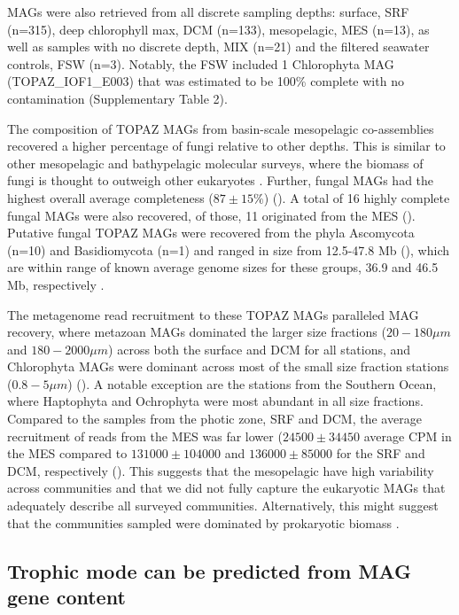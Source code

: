\documentclass[12pt]{article}
\numberwithin{equation}{section}
\begin{document}
MAGs were also retrieved from all discrete sampling depths: surface, SRF (n=315), deep chlorophyll max, DCM (n=133), mesopelagic, MES (n=13), as well as samples with no discrete depth, MIX (n=21) and the filtered seawater controls, FSW (n=3). Notably, the FSW included 1 Chlorophyta MAG (TOPAZ\_IOF1\_E003) that was estimated to be 100\% complete with no contamination (Supplementary Table 2). 

The composition of TOPAZ MAGs from basin-scale mesopelagic co-assemblies recovered a higher percentage of fungi relative to other depths. This is similar to other mesopelagic and bathypelagic molecular surveys, where the biomass of fungi is thought to outweigh other eukaryotes \citep{Morales_2019,Pernice_2015,Edgcomb_2010}. Further, fungal MAGs had the highest overall average completeness ($87 \pm 15\%$) (). A total of 16 highly complete fungal MAGs were also recovered, of those, 11 originated from the MES (). Putative fungal TOPAZ MAGs were recovered from the phyla Ascomycota (n=10) and Basidiomycota (n=1) and ranged in size from 12.5-47.8 Mb (), which are within range of known average genome sizes for these groups, 36.9 and 46.5 Mb, respectively \citep{Mohanta_2015}. 

The metagenome read recruitment to these TOPAZ MAGs paralleled MAG recovery, where metazoan MAGs dominated the larger size fractions ($20-180 \mu m$ and $180-2000 \mu m$) across both the surface and DCM for all stations, and Chlorophyta MAGs were dominant across most of the small size fraction stations ($0.8-5 \mu m$) (). A notable exception are the stations from the Southern Ocean, where Haptophyta and Ochrophyta were most abundant in all size fractions. Compared to the samples from the photic zone, SRF and DCM, the average recruitment of reads from the MES was far lower ($24500 \pm 34450$ average CPM in the MES compared to $131000 \pm 104000 $ and $136000 \pm 85000$ for the SRF and DCM, respectively (). This suggests that the mesopelagic have high variability across communities \citep{Pernice_2015} and that we did not fully capture the eukaryotic MAGs that adequately describe all surveyed communities. Alternatively, this might suggest that the communities sampled were dominated by prokaryotic biomass \citep{Pernice_2014}.  


\subsection*{Trophic mode can be predicted from MAG gene content}
\end{document}

